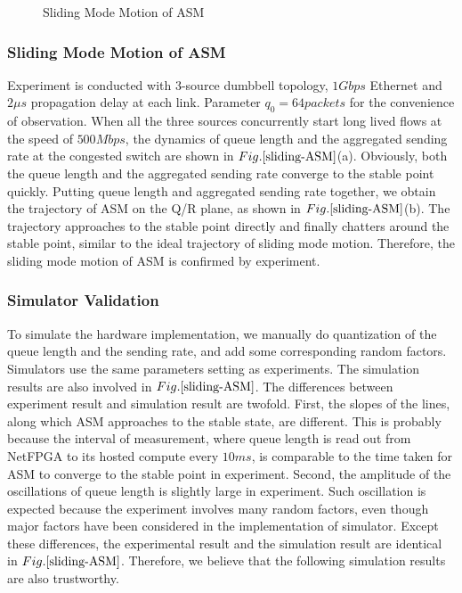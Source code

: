 \documentclass{sig-alternate-10pt}
\def\figurename{Fig.}
\begin{document}
\begin{figure}
\centering
{}
\caption{Sliding Mode Motion of ASM}
\label{sliding-ASM}
\end{figure}


\subsubsection{Sliding Mode Motion of ASM}
Experiment is conducted with 3-source dumbbell topology, $1Gbps$ Ethernet and $2\mu s$ propagation delay at each link. Parameter $q_0=64 packets$ for the convenience of observation. When all the three sources concurrently start long lived flows at the speed of $500Mbps$, the dynamics of queue length and the aggregated sending rate at the congested switch are shown in $\figurename{\ref{sliding-ASM}}$(a). Obviously, both the queue length and the aggregated sending rate converge to the stable point quickly. Putting queue length and aggregated sending rate together, we obtain the trajectory of ASM on the Q/R plane, as shown in $\figurename{\ref{sliding-ASM}}$(b). The trajectory approaches to the stable point directly and finally chatters around the stable point, similar to the ideal trajectory of sliding mode motion. Therefore, the sliding mode motion of ASM is confirmed by experiment. 


\subsubsection{Simulator Validation}
To simulate the hardware implementation, we manually do quantization of the queue length and the sending rate, and add some corresponding random factors. Simulators use the same parameters setting as experiments. The simulation results are also involved in $\figurename{\ref{sliding-ASM}}$.
The differences between experiment result and simulation result are twofold. First, the slopes of the lines, along which ASM approaches to the stable state, are different. This is probably because the interval of measurement, where queue length is read out from NetFPGA to its hosted compute every $10ms$, is comparable to the time taken for ASM to converge to the stable point in experiment. Second, the amplitude of the oscillations of queue length is slightly large in experiment. Such oscillation is expected because the experiment involves many random factors, even though major factors have been considered in the implementation of simulator. Except these differences, the experimental result and the simulation result are identical in $\figurename{\ref{sliding-ASM}}$. Therefore, we believe that the following simulation results are also trustworthy.
\end{document}
